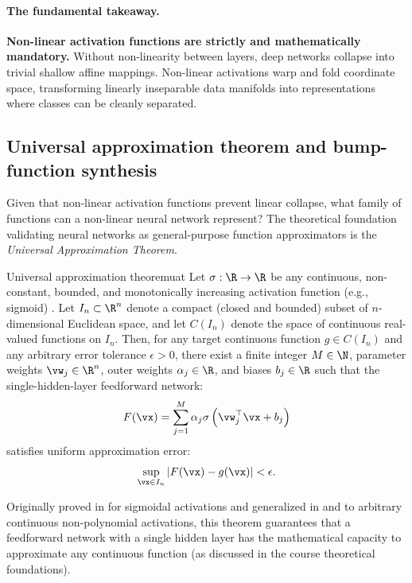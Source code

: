 \documentclass[../../main.tex]{subfiles}
\begin{document}
\paragraph{The fundamental takeaway.}
\textbf{Non-linear activation functions are strictly and mathematically mandatory.} Without non-linearity between layers, deep networks collapse into trivial shallow affine mappings. Non-linear activations warp and fold coordinate space, transforming linearly inseparable data manifolds into representations where classes can be cleanly separated.

\subsection{Universal approximation theorem and bump-function synthesis}
\label{subsec:uat_derivation}

Given that non-linear activation functions prevent linear collapse, what family of functions can a non-linear neural network represent? The theoretical foundation validating neural networks as general-purpose function approximators is the \emph{Universal Approximation Theorem}.

\begin{theorem}{Universal approximation theorem}{uat}
Let $\sigma: \R \to \R$ be any continuous, non-constant, bounded, and monotonically increasing activation function (e.g., sigmoid) \cite{cybenko1989}. Let $I_n \subset \R^n$ denote a compact (closed and bounded) subset of $n$-dimensional Euclidean space, and let $C(I_n)$ denote the space of continuous real-valued functions on $I_n$. Then, for any target continuous function $g \in C(I_n)$ and any arbitrary error tolerance $\epsilon > 0$, there exist a finite integer $M \in \N$, parameter weights $\vw_j \in \R^n$, outer weights $\alpha_j \in \R$, and biases $b_j \in \R$ such that the single-hidden-layer feedforward network:
\begin{equation}
\label{eq:uat_form}
F(\vx) = \sum_{j=1}^M \alpha_j \sigma\left( \vw_j^\top \vx + b_j \right)
\end{equation}
satisfies uniform approximation error:
\begin{equation}
\label{eq:uat_bound}
\sup_{\vx \in I_n} \left| F(\vx) - g(\vx) \right| < \epsilon.
\end{equation}
\end{theorem}

Originally proved in \cite{cybenko1989} for sigmoidal activations and generalized in \cite{hornik1989} and \cite{leshno1993} to arbitrary continuous non-polynomial activations, this theorem guarantees that a feedforward network with a single hidden layer has the mathematical capacity to approximate any continuous function (as discussed in the course theoretical foundations).
\end{document}
